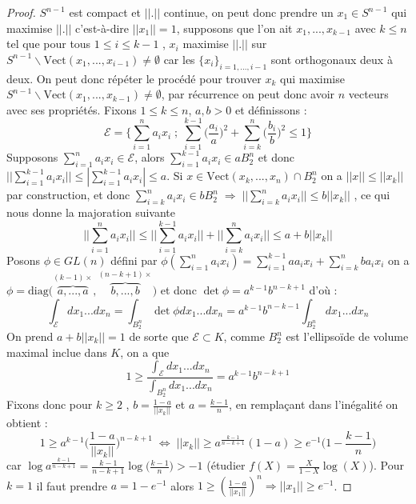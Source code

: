 \documentclass[12pt]{article}
\theoremstyle{definition}
\begin{document}
\begin{proof}
	$S^{n-1}$ est compact et $||.||$ continue, on peut donc prendre un $x_1\in S^{n-1}$ qui maximise $||.||$ c'est-à-dire $||x_1||=1$, supposons que l'on ait $x_1,...,x_{k-1}$ avec $k\leq n$ tel que pour tous $1\leq i\leq k-1$ , $x_i$ maximise $||.||$ sur $S^{n-1}\backslash \text{Vect}(x_1,...,x_{i-1})\neq \emptyset$ car les $\{x_i\}_{i=1,...,i-1}$ sont orthogonaux deux à deux. On peut donc répéter le procédé pour trouver $x_{k}$ qui maximise $S^{n-1}\backslash \text{Vect}(x_1,...,x_{k-1})\neq \emptyset$, par récurrence on peut donc avoir $n$ vecteurs avec ses propriétés. Fixons $1\leq k \leq n$, $a,b>0$ et définissons :
	\begin{equation*}
	\mathcal{E} = \Big\{\sum_{i=1}^{n}a_ix_i\; ; \; \sum_{i=1}^{k-1}\big(\frac{a_i}{a}\big)^2+ \sum_{i=k}^{n}\big(\frac{b_i}{b}\big)^2\leq 1 \Big\}
	\end{equation*}
	Supposons $\sum_{i=1}^{n}a_ix_i\in \mathcal{E}$, alors $\sum_{i=1}^{k-1}a_ix_i\in aB_2^n$ et donc $||\sum_{i=1}^{k-1}a_ix_i||\leq|\sum_{i=1}^{k-1}a_ix_i|\leq a$.
	Si $x\in \text{Vect}(x_k,...,x_n)\cap B^n_2$ on a $||x||\leq ||x_k||$ par construction, et donc $\sum_{i=k}^{n}a_ix_i\in bB_2^n \; \Rightarrow \; ||\sum_{i=k}^{n}a_ix_i ||\leq b||x_k||$ , ce qui nous donne la majoration suivante 
	\begin{equation*}
	||\sum_{i=1}^{n}a_ix_i||\leq ||\sum_{i=1}^{k-1}a_ix_i||+||\sum_{i=k}^{n}a_ix_i||\leq a + b||x_k||
	\end{equation*}
	Posons $\phi\in GL(n)$ défini par $\phi(\sum_{i=1}^{n}a_ix_i)=\sum_{i=1}^{k-1}aa_ix_i+\sum_{i=k}^{n}ba_ix_i$ on a $\phi = \text{diag}\big(\overbrace{a,...,a}^{(k-1)\times},\overbrace{b,...,b}^{(n-k+1) \times}\big)$ et donc $\det \phi = a^{k-1}b^{n-k+1}$ d'où :
	\begin{equation*}
	\int_{\mathcal{E}} dx_1...dx_n = \int_{B_2^n} \det \phi dx_1...dx_n= a^{k-1}b^{n-k-1}\int_{B_2^n}dx_1...dx_n
	\end{equation*}
	On prend $a+b||x_k||= 1$ de sorte que $\mathcal{E}\subset K$, comme $B_2^n$ est l'ellipsoïde de volume maximal inclue dans $K$, on a que  
	\begin{equation*}
	1\geq\frac{\int_{\mathcal{E}} dx_1...dx_n}{\int_{B_2^n}dx_1...dx_n}=a^{k-1}b^{n-k+1}
	\end{equation*}
	Fixons donc pour $k\geq 2$ , $b=\frac{1-a}{||x_k||}$ et $a=\frac{k-1}{n}$, en remplaçant dans l'inégalité on obtient :
	\begin{equation*}
	1\geq a^{k-1} \Big(\frac{1-a}{||x_k||}\Big)^{n-k+1} \; \iff \; ||x_k||\geq a^{\frac{k-1}{n-k+1}}(1-a) \geq e^{-1}\Big(1-\frac{k-1}{n}\Big)
	\end{equation*}
	car $\log a^{\frac{k-1}{n-k+1}}= \frac{k-1}{n-k+1}\log\Big(\frac{k-1}{n}\Big)>-1$ (étudier $f(X)=\frac{X}{1-X}\log(X)$). Pour $k=1$ il faut prendre $a=1-e^{-1}$ alors $1\geq \left(\frac{1-a}{||x_1||}\right)^n\Rightarrow ||x_1||\geq e^{-1}$.
	
\end{proof}
\end{document}
